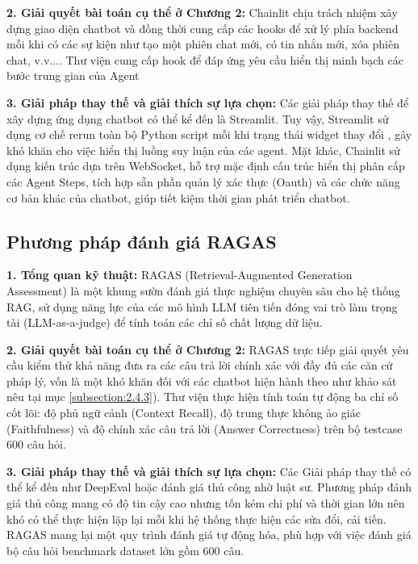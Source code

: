\documentclass[../DoAn.tex]{subfiles}
\begin{document}
\textbf{2. Giải quyết bài toán cụ thể ở Chương 2:}
Chainlit chịu trách nhiệm xây dựng giao diện chatbot và đồng thời cung cấp các hooks để xử lý phía backend mỗi khi có các sự kiện như tạo một phiên chat mới, có tin nhắn mới, xóa phiên chat, v.v.... Thư viện cung cấp hook để đáp ứng yêu cầu hiển thị minh bạch các bước trung gian của Agent

\textbf{3. Giải pháp thay thế và giải thích sự lựa chọn:}
Các giải pháp thay thế để xây dựng ứng dụng chatbot có thể kể đến là Streamlit. Tuy vậy, Streamlit sử dụng cơ chế rerun toàn bộ Python script mỗi khi trạng thái widget thay đổi \cite{StreamlitDoc}, gây khó khăn cho việc hiển thị luồng suy luận của các agent. Mặt khác, Chainlit sử dụng kiến trúc dựa trên WebSocket, hỗ trợ mặc định cấu trúc hiển thị phân cấp các Agent Steps, tích hợp sẵn phần quản lý xác thực (Oauth) và các chức năng cơ bản khác của chatbot, giúp tiết kiệm thời gian phát triển chatbot.

\subsection{Phương pháp đánh giá RAGAS}
\label{subsection:3.4.2}

\textbf{1. Tổng quan kỹ thuật:}
RAGAS (Retrieval-Augmented Generation Assessment) là một khung sườn đánh giá thực nghiệm chuyên sâu cho hệ thống RAG, sử dụng năng lực của các mô hình LLM tiên tiến đóng vai trò làm trọng tài (LLM-as-a-judge) để tính toán các chỉ số chất lượng dữ liệu.

\textbf{2. Giải quyết bài toán cụ thể ở Chương 2:}
RAGAS trực tiếp giải quyết yêu cầu kiểm thử khả năng đưa ra các câu trả lời chính xác với đầy đủ các căn cứ pháp lý, vốn là một khó khăn đối với các chatbot hiện hành theo như khảo sát nêu tại mục \ref{subsection:2.4.3}). Thư viện thực hiện tính toán tự động ba chỉ số cốt lõi: độ phủ ngữ cảnh (Context Recall), độ trung thực không ảo giác (Faithfulness) và độ chính xác câu trả lời (Answer Correctness) trên bộ testcase 600 câu hỏi.

\textbf{3. Giải pháp thay thế và giải thích sự lựa chọn:}
Các Giải pháp thay thế có thể kể đến như DeepEval hoặc đánh giá thủ công nhờ luật sư. Phương pháp đánh giá thủ công mang có độ tin cậy cao nhưng tốn kém chi phí và thời gian lớn nên khó có thể thực hiện lặp lại mỗi khi hệ thống thực hiện các sửa đổi, cải tiến. RAGAS mang lại một quy trình đánh giá tự động hóa, phù hợp với việc đánh giá bộ câu hỏi benchmark dataset lớn gồm 600 câu.
\end{document}
